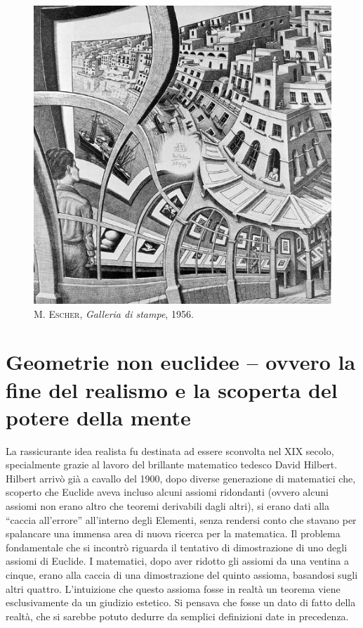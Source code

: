 \documentclass[a4paper,10pt]{article}
\begin{document}
\begin{figure}[t]
 \centering
 \includegraphics{./pics/escher[3].jpg}
 \caption{\textsc{M. Escher}, \textit{Galleria di stampe}, 1956.}
\end{figure}

\section[Geometrie non euclidee]{Geometrie non euclidee -- ovvero la fine del realismo e la scoperta del potere della mente}

La rassicurante idea realista fu destinata ad essere sconvolta nel XIX secolo, specialmente grazie al lavoro del brillante matematico tedesco David Hilbert.
Hilbert arrivò già a cavallo del 1900, dopo diverse generazione di matematici che, scoperto che Euclide aveva incluso alcuni assiomi ridondanti (ovvero alcuni assiomi non erano altro che teoremi derivabili dagli altri), si erano dati alla “caccia all'errore” all'interno degli Elementi, senza rendersi conto che stavano per spalancare una immensa area di nuova ricerca per la matematica.
Il problema fondamentale che si incontrò riguarda il tentativo di dimostrazione di uno degli assiomi di Euclide. I matematici, dopo aver ridotto gli assiomi da una ventina a cinque, erano alla caccia di una dimostrazione del quinto assioma, basandosi sugli altri quattro. L'intuizione che questo assioma fosse in realtà un teorema viene esclusivamente da un giudizio estetico. Si pensava che fosse un dato di fatto della realtà, che si sarebbe potuto dedurre da semplici definizioni date in precedenza.
\end{document}

